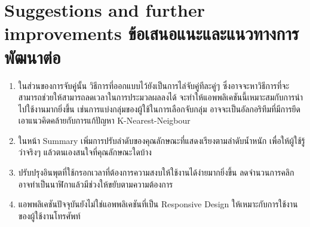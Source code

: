 \section{\ifenglish%
Suggestions and further improvements
\else%
ข้อเสนอแนะและแนวทางการพัฒนาต่อ
\fi
}
\begin{enumerate}
  \item ในส่วนของการจับคู่นั้น วิธีการที่ออกแบบไว้ยังเป็นการไล่จับคู่ทีละคู่ๆ ซึ่งอาจจะหาวิธีการที่จะสามารถช่วยให้สามารถลดเวลาในการประมวลผลลงได้ 
  จะทำให้แอพพลิเคชันนี้เหมาะสมกับการนำไปใช้งานมากยิ่งขึ้น เช่นการแบ่งกลุ่มของผู้ใช้ในการเลือกจับกลุ่ม อาจจะเป็นอัลกอริทึมที่มีการยึดเอาแนวคิดคล้ายกับการแก้ปัญหา 
  K-Nearest-Neigbour 
  \item ในหน้า Summary เพิ่มการปรับลำดับของคุณลักษณะที่แสดงเรียงตามลำดับน้ำหนัก เพื่อให้ผู้ใช้รู้ว่าจริงๆ แล้วตนเองสนใจที่คุณลักษณะใดบ้าง
  \item ปรับปรุงอินพุตที่ใช้กรอกเวลาที่ต้องการความสงบให้ใช้งานได้ง่ายมากยิ่งขึ้น ลดจำนวนการคลิก อาจทำเป็นนาฬิกาแล้วมีช่วงให้ขยับตามความต้องการ
  \item แอพพลิเคชันปัจจุบันยังไม่ใช่แอพพลิเคชันที่เป็น Responsive Design ให้เหมาะกับการใช้งานของผู้ใช้งานโทรศัพท์
\end{enumerate}









